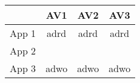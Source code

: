 \begin{tabular}{c|c c c}
    & AV1 & AV2 & AV3 \\
    \hline
    App 1 & adrd & adrd & adrd \\
    App 2 & & & \\
    App 3 & adwo & adwo & adwo \\
\end{tabular}
